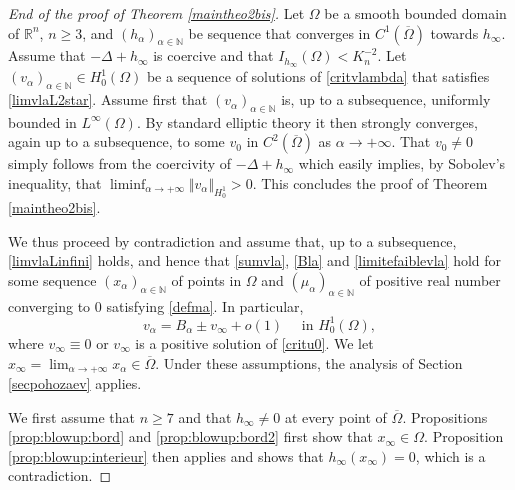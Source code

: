 \documentclass[10pt]{amsart}
\numberwithin{equation}{section}
\newcommand{\Om}{\Omega}
\newcommand{\ma}{\mu_\alpha}
\def \rr {\mathbb{R}}
\def \ma{\mu_{\alpha}}
\def \va{v_{\alpha}}
\def \ha{h_{\alpha}}
\def \hi{h_{\infty}}
\def \nn{\mathbb{N}}
\theoremstyle{plain}
\theoremstyle{remark}
\begin{document}
 \begin{proof}[End of the proof of Theorem \ref{maintheo2bis}]
 	Let $\Om$ be a smooth bounded domain of $\rr^n$, $n\geq 3$, and $(\ha)_{\alpha\in\nn}$ be sequence that converges in $C^{1}(\overline{\Om})$ towards $\hi$. Assume that $-\Delta+\hi$ is coercive and that $I_{\hi}(\Om)<K_{n}^{-2}$. Let $(\va)_{\alpha\in\nn}\in H_0^1(\Om)$ be a sequence of solutions of \eqref{critvlambda} that satisfies \eqref{limvlaL2star}. Assume first that $(\va)_{\alpha \in \mathbb{N}}$ is, up to a subsequence, uniformly bounded in $L^\infty(\Om)$. By standard elliptic theory it then strongly converges, again up to a subsequence, to some $v_0$ in $C^2(\overline{\Om})$ as $\alpha \to + \infty$. That $v_0 \neq 0$ simply follows from the coercivity of $-\Delta + h_\infty$ which easily implies, by Sobolev's inequality, that $\liminf_{\alpha \to + \infty} \Vert \va \Vert_{H^1_0} >0$. This concludes the proof of Theorem \ref{maintheo2bis}.
	
We thus proceed by contradiction and assume that, up to a subsequence, \eqref{limvlaLinfini} holds, and hence that \eqref{sumvla}, \eqref{Bla} and \eqref{limitefaiblevla} hold for some sequence $(x_{\alpha})_{\alpha \in \mathbb{N}}$ of points in $\Om$ and $(\ma)_{\alpha \in \mathbb{N}}$ of positive real number converging to $0$ satisfying \eqref{defma}. In particular,
$$ v_\alpha = B_{\alpha} \pm v_\infty + o(1) \quad \text{ in } H^1_0(\Om),$$
where $v_{\infty}\equiv 0$ or $v_\infty$ is a positive solution of \eqref{critu0}. We let $x_\infty = \lim_{\alpha \to + \infty} x_\alpha \in \overline{\Om}$. Under these assumptions, the analysis of Section \ref{secpohozaev} applies. 

We first assume that  $n \ge 7$ and that $\hi \neq 0$ at every point of $\overline{\Om}$. Propositions  \ref{prop:blowup:bord} and  \ref{prop:blowup:bord2}  first show that $x_\infty \in \Om$. Proposition \ref{prop:blowup:interieur} then applies and shows that $\hi(x_\infty) = 0$, which is a contradiction.


\end{proof}
\end{document}
